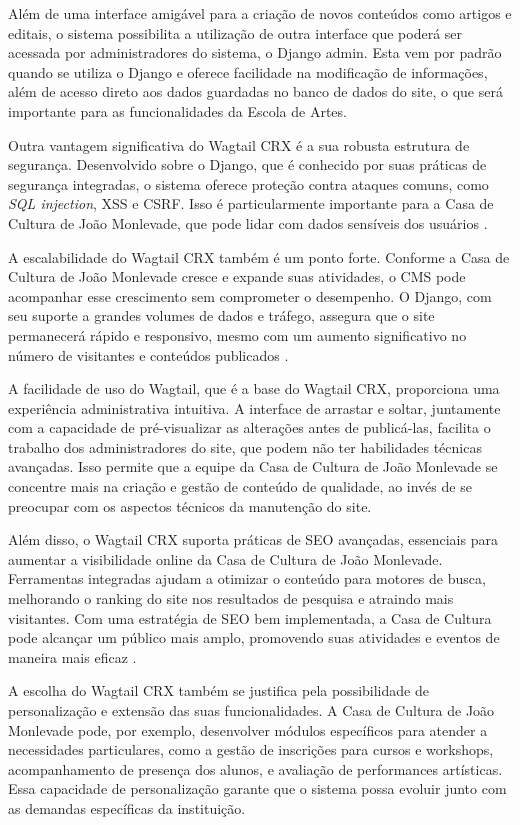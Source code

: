 Além de uma interface amigável para a criação de novos conteúdos como artigos e editais, o sistema possibilita a utilização de outra interface que poderá ser acessada por administradores do sistema, o Django admin. Esta vem por padrão quando se utiliza o Django e oferece facilidade na modificação de informações, além de acesso direto aos dados guardadas no banco de dados do site, o que será importante para as funcionalidades da Escola de Artes.

Outra vantagem significativa do Wagtail CRX é a sua robusta estrutura de segurança. Desenvolvido sobre o Django, que é conhecido por suas práticas de segurança integradas, o sistema oferece proteção contra ataques comuns, como \textit{SQL injection}, \ac{XSS} e \ac{CSRF}. Isso é particularmente importante para a Casa de Cultura de João Monlevade, que pode lidar com dados sensíveis dos usuários \cite{DjangoCSRF}.

A escalabilidade do Wagtail CRX também é um ponto forte. Conforme a Casa de Cultura de João Monlevade cresce e expande suas atividades, o \ac{CMS} pode acompanhar esse crescimento sem comprometer o desempenho. O Django, com seu suporte a grandes volumes de dados e tráfego, assegura que o site permanecerá rápido e responsivo, mesmo com um aumento significativo no número de visitantes e conteúdos publicados \cite{ghimire2020comparative}.

A facilidade de uso do Wagtail, que é a base do Wagtail CRX, proporciona uma experiência administrativa intuitiva. A interface de arrastar e soltar, juntamente com a capacidade de pré-visualizar as alterações antes de publicá-las, facilita o trabalho dos administradores do site, que podem não ter habilidades técnicas avançadas. Isso permite que a equipe da Casa de Cultura de João Monlevade se concentre mais na criação e gestão de conteúdo de qualidade, ao invés de se preocupar com os aspectos técnicos da manutenção do site.

Além disso, o Wagtail CRX suporta práticas de \ac{SEO} avançadas, essenciais para aumentar a visibilidade online da Casa de Cultura de João Monlevade. Ferramentas integradas ajudam a otimizar o conteúdo para motores de busca, melhorando o ranking do site nos resultados de pesquisa e atraindo mais visitantes. Com uma estratégia de \ac{SEO} bem implementada, a Casa de Cultura pode alcançar um público mais amplo, promovendo suas atividades e eventos de maneira mais eficaz \cite{WagtailCRXSEO}.

A escolha do Wagtail CRX também se justifica pela possibilidade de personalização e extensão das suas funcionalidades. A Casa de Cultura de João Monlevade pode, por exemplo, desenvolver módulos específicos para atender a necessidades particulares, como a gestão de inscrições para cursos e workshops, acompanhamento de presença dos alunos, e avaliação de performances artísticas. Essa capacidade de personalização garante que o sistema possa evoluir junto com as demandas específicas da instituição.

